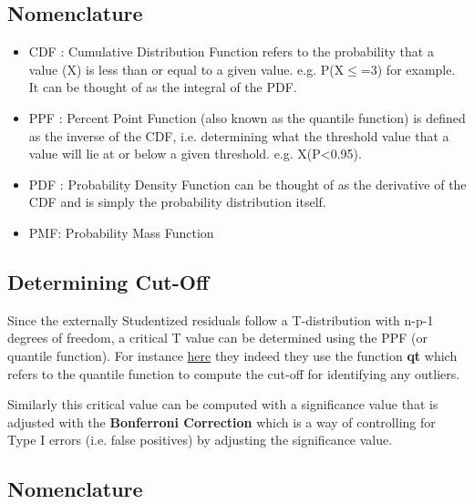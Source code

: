 \documentclass{article}
\begin{document}
\subsection{Nomenclature}

\begin{itemize}
	\item CDF : Cumulative Distribution Function refers to the probability that a value (X) is less than or equal to a given value. e.g. P(X$\leq$=3) for example. It can be thought of as the integral of the PDF. 
	\item PPF : Percent Point Function (also known as the quantile function) is defined as the inverse of the CDF, i.e. determining what the threshold value that a value will lie at or below a given threshold. e.g. X(P<0.95). 
	\item PDF : Probability Density Function can be thought of as the derivative of the CDF and is simply the probability distribution itself. 
	\item PMF: Probability Mass Function 
\end{itemize}


\subsection{Determining Cut-Off}

Since the externally Studentized residuals follow a T-distribution with n-p-1 degrees of freedom, a critical T value can be determined using the PPF (or quantile function). For instance  \href{https://web.stanford.edu/class/stats191/notebooks/Diagnostics_for_multiple_regression.html}{here} they indeed they use the function \textbf{qt} which refers to the quantile function to compute the cut-off for identifying any outliers. 

Similarly this critical value can be computed with a significance value that is adjusted with the \textbf{Bonferroni Correction} which is a way of controlling for Type I errors (i.e. false positives) by adjusting the significance value.

\subsection{Nomenclature}
	
\end{document}
